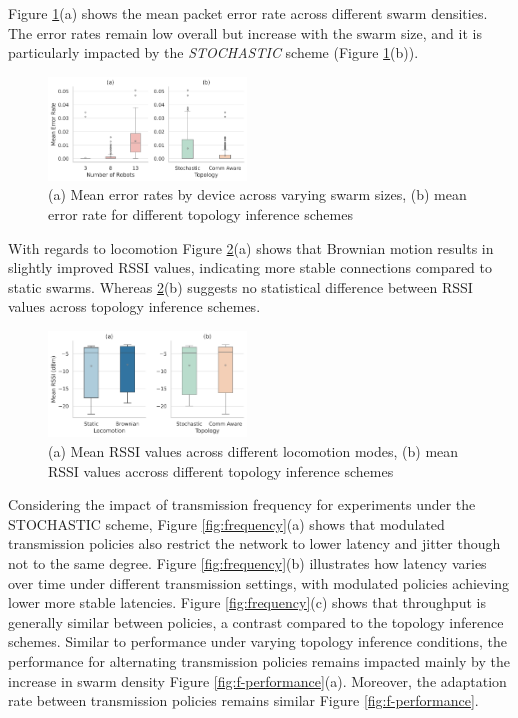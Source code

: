 \documentclass[conference]{IEEEtran}
\begin{document}
Figure \ref{fig:error-rates}(a) shows the mean packet error rate across different swarm densities. The error rates remain low overall but increase with the swarm size, and it is particularly impacted by the \emph{STOCHASTIC} scheme (Figure \ref{fig:error-rates}(b)).

\begin{figure}[H]
    \centering
    \includegraphics[width=0.47\textwidth]{reliability_impact.pdf}
    \caption{(a) Mean error rates by device across varying swarm sizes, (b) mean error rate for different topology inference schemes}
    \label{fig:error-rates}
\end{figure}

With regards to locomotion Figure \ref{fig:rssi}(a) shows that Brownian motion results in slightly improved RSSI values, indicating more stable connections compared to static swarms. Whereas \ref{fig:rssi}(b) suggests no statistical difference between RSSI values across topology inference schemes.

\begin{figure}[H]
    \centering
    \includegraphics[width=0.47\textwidth]{speed_impact.pdf}
    \caption{(a) Mean RSSI values across different locomotion modes, (b) mean RSSI values accross different topology inference schemes}
    \label{fig:rssi}
\end{figure}

Considering the impact of transmission frequency for experiments under the STOCHASTIC scheme, Figure \ref{fig:frequency}(a) shows that modulated transmission policies also restrict the network to lower latency and jitter though not to the same degree. Figure \ref{fig:frequency}(b) illustrates how latency varies over time under different transmission settings, with modulated policies achieving lower more stable latencies. Figure \ref{fig:frequency}(c) shows that throughput is generally similar between policies, a contrast compared to the topology inference schemes. Similar to performance under varying topology inference conditions, the performance for alternating transmission policies remains impacted mainly by the increase in swarm density Figure \ref{fig:f-performance}(a). Moreover, the adaptation rate between transmission policies remains similar Figure \ref{fig:f-performance}.\\
\end{document}
